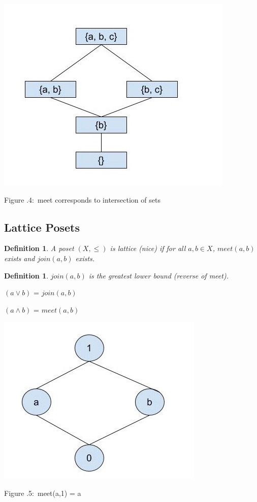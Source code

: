 \documentclass[twoside]{article}
\newcounter{lecnum}
\newcommand{\fig}[3]{
			\vspace{#2}
			\begin{center}
			Figure \thelecnum.#1:~#3
			\end{center}
	}
\newtheorem{definition}[theorem]{Definition}
\begin{document}
\begin{minipage}[]{\textwidth}
\centering
\includegraphics[width=.5\textwidth]{meet_intersection.jpg}
\end{minipage}
\fig{4}{0cm}{meet corresponds to intersection of sets}

\subsection{Lattice Posets}
\begin{definition}
A poset $(X, \leq)$ is lattice (nice) if for all $a,b \in X$, $meet(a, b)$ exists and $join(a,b)$ exists.
\end{definition}

\begin{definition}
$join(a,b)$ is the greatest lower bound (reverse of meet).
\end{definition}

$(a \vee b)$ = $join(a,b)$

$(a \wedge b)$ = $meet(a,b)$


\begin{minipage}[]{\textwidth}
\centering
\includegraphics[width=.5\textwidth]{lattice1.jpg}
\end{minipage}
\fig{5}{0cm}{meet(a,1) = a}
\end{document}
